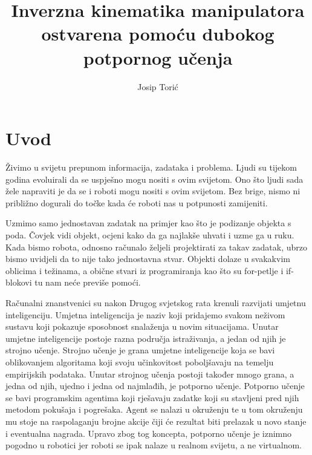 \documentclass[times,utf8,diplomski]{fer}
\begin{document}

\title{Inverzna kinematika manipulatora ostvarena pomoću dubokog potpornog učenja}

\author{Josip Torić}






\tableofcontents

\chapter{Uvod}

Živimo u svijetu prepunom informacija, zadataka i problema. Ljudi su tijekom godina evoluirali da se uspješno mogu nositi s ovim svijetom. Ono što ljudi sada žele napraviti je da se i roboti mogu nositi s ovim svijetom. Bez brige, nismo ni približno dogurali do točke kada će roboti nas u potpunosti zamijeniti.

Uzmimo samo jednostavan zadatak na primjer kao što je podizanje objekta s poda. Čovjek vidi objekt, ocjeni kako da ga najlakše uhvati i uzme ga u ruku. Kada bismo robota, odnosno računalo željeli projektirati za takav zadatak, ubrzo bismo uvidjeli da to nije tako jednostavna stvar. Objekti dolaze u svakakvim oblicima i težinama, a obične stvari iz programiranja kao što su for-petlje i if-blokovi tu nam neće previše pomoći.

Računalni znanstvenici su nakon Drugog svjetskog rata krenuli razvijati umjetnu inteligenciju. Umjetna inteligencija je naziv koji pridajemo svakom neživom sustavu koji pokazuje sposobnost snalaženja u novim situacijama. Unutar umjetne inteligencije postoje razna područja istraživanja, a jedan od njih je strojno učenje. Strojno učenje je grana umjetne inteligencije koja se bavi oblikovanjem algoritama koji svoju učinkovitost poboljšavaju na temelju empirijskih podataka. Unutar strojnog učenja postoji također mnogo grana, a jedna od njih, ujedno i jedna od najmlađih, je potporno učenje. Potporno učenje se bavi programskim agentima koji rješavaju zadatke koji su stavljeni pred njih metodom pokušaja i pogrešaka. Agent se nalazi u okruženju te u tom okruženju mu stoje na raspolaganju brojne akcije čiji će rezultat biti prelazak u novo stanje i eventualna nagrada. Upravo zbog tog koncepta, potporno učenje je iznimno pogodno u robotici jer roboti se ipak nalaze u realnom svijetu, a ne virtualnom.
\end{document}

